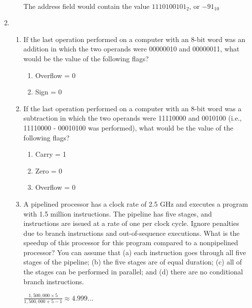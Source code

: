 \documentclass{article}
\begin{document}
\begin{enumerate}
\begin{enumerate}
					\paragraph{} The address field would contain the value \(1110100101_2\), or \(-91_{10}\)
	      \end{enumerate}

	\item
	      \begin{enumerate}
		      \item If the last operation performed on a computer with an 8-bit word was an addition in
		            which the two operands were 00000010 and 00000011, what would be the value of the following flags?
		            \begin{enumerate}
			            \item Overflow = 0
			            \item Sign = 0
		            \end{enumerate}

		      \item If the last operation performed on a computer with an 8-bit word was a subtraction in
		            which the two operands were 11110000 and 0010100 (i.e., 11110000 - 00010100 was performed), what
		            would be the value of the following flags?
		            \begin{enumerate}
			            \item Carry = 1
			            \item Zero = 0
			            \item Overflow = 0
		            \end{enumerate}

		      \item A pipelined processor has a clock rate of 2.5 GHz and executes a program with 1.5 million
		            instructions. The pipeline has five stages, and instructions are issued at a rate of one per clock cycle.
		            Ignore penalties due to branch instructions and out-of-sequence executions. What is the speedup of
		            this processor for this program compared to a nonpipelined processor? You can assume that (a) each
		            instruction goes through all five stages of the pipeline; (b) the five stages are of equal duration; (c) all of
		            the stages can be performed in parallel; and (d) there are no conditional branch instructions.
					
					\centering
					\( \frac{1,500,000 \times 5}{1,500,000 + 5 - 1} \approx 4.999...\)
	      \end{enumerate}


\end{enumerate}
\end{document}
